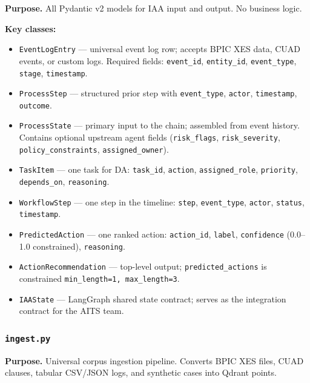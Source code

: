 \documentclass[12pt,a4paper]{article}
\begin{document}
\textbf{Purpose.} All Pydantic v2 models for IAA input and output. No business logic.

\textbf{Key classes:}
\begin{itemize}[nosep]
  \item \texttt{EventLogEntry} --- universal event log row; accepts BPIC XES data,
    CUAD events, or custom logs. Required fields: \texttt{event\_id}, \texttt{entity\_id},
    \texttt{event\_type}, \texttt{stage}, \texttt{timestamp}.
  \item \texttt{ProcessStep} --- structured prior step with \texttt{event\_type},
    \texttt{actor}, \texttt{timestamp}, \texttt{outcome}.
  \item \texttt{ProcessState} --- primary input to the chain; assembled from event
    history. Contains optional upstream agent fields (\texttt{risk\_flags},
    \texttt{risk\_severity}, \texttt{policy\_constraints}, \texttt{assigned\_owner}).
  \item \texttt{TaskItem} --- one task for DA: \texttt{task\_id}, \texttt{action},
    \texttt{assigned\_role}, \texttt{priority}, \texttt{depends\_on}, \texttt{reasoning}.
  \item \texttt{WorkflowStep} --- one step in the timeline: \texttt{step},
    \texttt{event\_type}, \texttt{actor}, \texttt{status}, \texttt{timestamp}.
  \item \texttt{PredictedAction} --- one ranked action: \texttt{action\_id},
    \texttt{label}, \texttt{confidence} (0.0--1.0 constrained), \texttt{reasoning}.
  \item \texttt{ActionRecommendation} --- top-level output; \texttt{predicted\_actions}
    is constrained \texttt{min\_length=1, max\_length=3}.
  \item \texttt{IAAState} --- LangGraph shared state contract; serves as the integration
    contract for the AITS team.
\end{itemize}

\subsubsection{\texttt{ingest.py}}

\textbf{Purpose.} Universal corpus ingestion pipeline. Converts BPIC XES files,
CUAD clauses, tabular CSV/JSON logs, and synthetic cases into Qdrant points.
\end{document}
